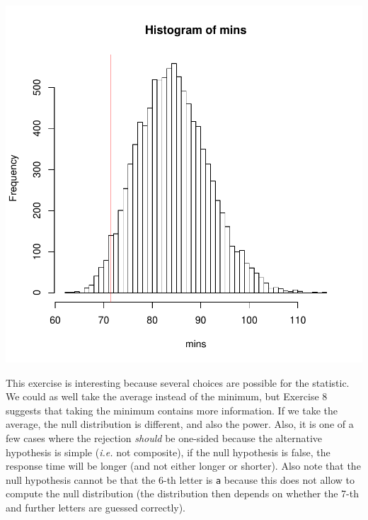 \documentclass[12pt]{article}
\begin{document}
\begin{Answer}[ref={exo9}]
  \centerline{\includegraphics[scale=0.5]{mins.pdf}}

  This exercise is interesting because several choices are
  possible for the statistic. We could as well take the average
  instead of the minimum, but Exercise 8 suggests that taking
  the minimum contains more information. If we take the average,
  the null distribution is different, and also the power. Also,
  it is one of a few cases where the rejection \textit{should}
  be one-sided because the alternative hypothesis is simple
  (\textit{i.e.} not composite), if the null hypothesis is
  false, the response time will be longer (and not either
  longer or shorter). Also note that the null hypothesis cannot
  be that the 6-th letter is \texttt{a} because this does not
  allow to compute the null distribution (the distribution then
  depends on whether the 7-th and further letters are guessed
  correctly).

\end{Answer}
\end{document}
